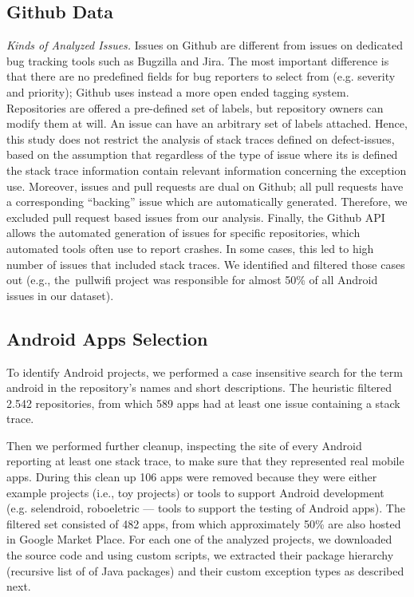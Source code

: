 \documentclass[conference]{IEEEtran}
\begin{document}
\subsection{Github Data}
\label{sec:git}

\noindent\emph{Kinds of Analyzed Issues.} Issues on Github are different from
issues on dedicated bug tracking tools such as Bugzilla and Jira. The most
important difference is that there are no predefined fields for bug reporters to
select from (e.g. severity and priority); Github uses instead a more open ended
tagging system. Repositories are offered a pre-defined set of labels, but
repository owners can modify them at will. An issue can have an arbitrary set of
labels attached. Hence, this study does not restrict the analysis of stack
traces defined on defect-issues, based on the assumption that regardless of the
type of issue where its is defined the stack trace information contain relevant
information concerning the exception use. Moreover, issues and pull requests are
dual on Github; all pull requests have a corresponding ``backing'' issue which
are automatically generated. Therefore, we excluded pull request based
issues from our analysis. Finally, the Github API allows the automated
generation of issues for specific repositories, which automated tools often use
to report crashes. In some cases, this led to high number of issues that
included stack traces. We identified and filtered those cases out (e.g.,
the~\textsf{pullwifi} project was responsible for almost 50\% of all Android issues in our dataset).

\subsection{Android Apps Selection}
\label{sec:android}

To identify Android projects, we performed a case insensitive search for the
term \textsf{android} in the repository's names and short descriptions.  The
heuristic filtered 2.542 repositories, from which 589 apps had at least one
issue containing a stack trace.

Then we performed further cleanup, inspecting the site of every Android
reporting at least one stack trace, to make sure that they represented real
mobile apps. During this clean up 106 apps were removed because they were either
example projects (i.e., toy projects) or tools to support Android development
(e.g. \textsf{selendroid}, \textsf{roboeletric} --- tools to support the testing of Android apps).
The filtered set consisted of 482 apps, from which approximately 50\% are also
hosted in Google Market Place. For each one of the analyzed projects, we
downloaded the source code and using custom scripts, we extracted their package
hierarchy (recursive list of of Java packages) and their custom exception types
as described next.
\end{document}
